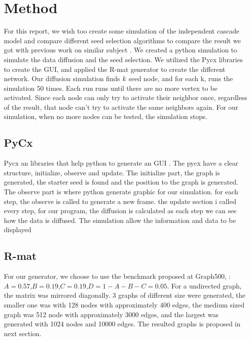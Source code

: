 \chapter{Method}
For this report, we wish too create some simulation of the independent cascade model and compare different seed selection algorithms to compare the result we got with previous work on similar subject \cite{MaximizeSpread2015}. We created a python simulation to simulate the data diffusion and the seed selection. We utilized the Pycx libraries to create the GUI, and applied the R-mat generator to create the different network. Our diffusion simulation finds $\it{k}$ seed node, and for each k, runs the simulation 50 times. Each run runs until there are no more vertex to be activated. Since each node can only try to activate their neighbor once, regardless of the result, that node can't try to activate the same neighbors again. For our simulation, when no more nodes can be tested, the simulation stops. 

\section{PyCx}
Pycx an libraries that help python to generate an GUI \cite{Pycx}. The pycx have a clear structure, initialize, observe and update. The initialize part, the graph is generated, the starter seed is found and the position to the graph is generated. The observe part is where python generate graphic for our simulation. for each step, the observe is called to generate a new frame. the update section i called every step, for our program, the diffusion is calculated as each step we can see how the data is diffused. The simulation allow the information and data to be displayed 


\section{R-mat}
For our generator, we choose to  use the benchmark proposed at Graph500, :$A=0.57$,$B=0.19$,$C=0.19$,$D = 1-A-B-C = 0.05$. For a undirected graph, the matrix was mirrored diagonally. 3 graphs of different size were generated, the smaller one was with 128 nodes with approximately 400 edges, the medium sized graph was 512 node with approximately 3000 edges, and the largest was generated with 1024 nodes and 10000 edges. The resulted graphs is proposed in next section. 

